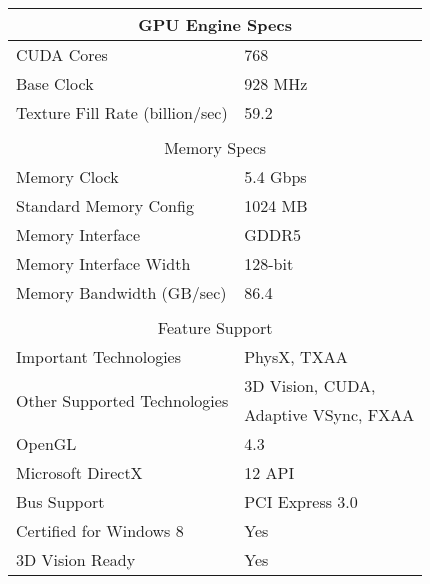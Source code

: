 \begin{table}[H]
  \begin{tabular}{ll}
  \hline
  \multicolumn{2}{|c|}{GPU Engine Specs} \\ \hline
  \multicolumn{1}{|l|}{CUDA Cores} & \multicolumn{1}{l|}{768} \\ \hline
  \multicolumn{1}{|l|}{Base Clock} & \multicolumn{1}{l|}{928 MHz} \\ \hline
  \multicolumn{1}{|l|}{Texture Fill Rate (billion/sec)} & \multicolumn{1}{l|}{59.2} \\ \hline
   &  \\ \hline
  \multicolumn{2}{|c|}{Memory Specs} \\ \hline
  \multicolumn{1}{|l|}{Memory Clock} & \multicolumn{1}{l|}{5.4 Gbps} \\ \hline
  \multicolumn{1}{|l|}{Standard Memory Config} & \multicolumn{1}{l|}{1024 MB} \\ \hline
  \multicolumn{1}{|l|}{Memory Interface} & \multicolumn{1}{l|}{GDDR5} \\ \hline
  \multicolumn{1}{|l|}{Memory Interface Width} & \multicolumn{1}{l|}{128-bit} \\ \hline
  \multicolumn{1}{|l|}{Memory Bandwidth (GB/sec)} & \multicolumn{1}{l|}{86.4} \\ \hline
   &  \\ \hline
  \multicolumn{2}{|c|}{Feature Support} \\ \hline
  \multicolumn{1}{|l|}{Important Technologies} & \multicolumn{1}{l|}{PhysX, TXAA} \\ \hline
  \multicolumn{1}{|l|}{\multirow{2}{*}{Other Supported Technologies}} & \multicolumn{1}{l|}{3D Vision, CUDA,} \\
  \multicolumn{1}{|l|}{} & \multicolumn{1}{l|}{Adaptive VSync, FXAA} \\ \hline
  \multicolumn{1}{|l|}{OpenGL} & \multicolumn{1}{l|}{4.3} \\ \hline
  \multicolumn{1}{|l|}{Microsoft DirectX} & \multicolumn{1}{l|}{12 API} \\ \hline
  \multicolumn{1}{|l|}{Bus Support} & \multicolumn{1}{l|}{PCI Express 3.0} \\ \hline
  \multicolumn{1}{|l|}{Certified for Windows 8} & \multicolumn{1}{l|}{Yes} \\ \hline
  \multicolumn{1}{|l|}{3D Vision Ready} & \multicolumn{1}{l|}{Yes} \\ \hline
  \end{tabular}
\end{table}

